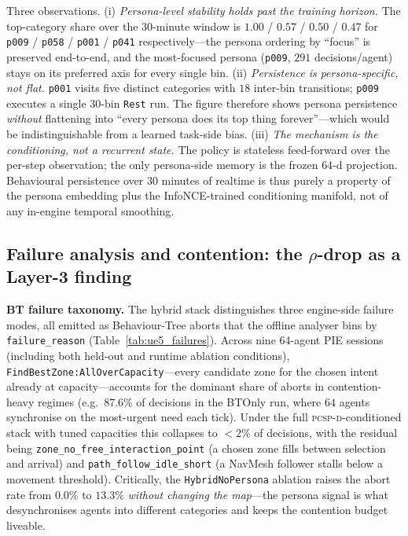 \documentclass[conference]{IEEEtran}
\newcommand{\PCSPD}{\textsc{pcsp-d}\xspace}
\begin{document}
Three observations. (i) \emph{Persona-level stability holds past the
training horizon.} The top-category share over the $30$-minute window
is $1.00$ / $0.57$ / $0.50$ / $0.47$ for \texttt{p009} / \texttt{p058} /
\texttt{p001} / \texttt{p041} respectively---the persona ordering by
``focus'' is preserved end-to-end, and the most-focused persona
(\texttt{p009}, $291$ decisions/agent) stays on its preferred axis for
every single bin. (ii) \emph{Persistence is persona-specific, not flat.}
\texttt{p001} visits five distinct categories with $18$ inter-bin
transitions; \texttt{p009} executes a single $30$-bin \texttt{Rest} run.
The figure therefore shows persona persistence \emph{without} flattening
into ``every persona does its top thing forever''---which would be
indistinguishable from a learned task-side bias. (iii) \emph{The
mechanism is the conditioning, not a recurrent state.} The policy is
stateless feed-forward over the per-step observation; the only
persona-side memory is the frozen $64$-d projection. Behavioural
persistence over $30$ minutes of realtime is thus purely a property of
the persona embedding plus the InfoNCE-trained conditioning manifold,
not of any in-engine temporal smoothing.


\subsection{Failure analysis and contention: the $\rho$-drop as a Layer-3 finding}
\label{sec:ue5_contention}

\textbf{BT failure taxonomy.}
The hybrid stack distinguishes three engine-side failure modes, all emitted
as Behaviour-Tree aborts that the offline analyser bins by
\texttt{failure\_reason} (Table~\ref{tab:ue5_failures}). Across nine 64-agent
PIE sessions
(including both held-out and runtime ablation conditions),
\texttt{FindBestZone:AllOverCapacity}---every candidate zone for the chosen
intent already at capacity---accounts for the dominant share of aborts in
contention-heavy regimes (e.g.\ 87.6\% of decisions in the BTOnly run, where
$64$ agents synchronise on the most-urgent need each tick). Under the full
\PCSPD-conditioned stack with tuned capacities this collapses to
$<\!2$\% of decisions, with the residual being
\texttt{zone\_no\_free\_interaction\_point} (a chosen zone fills between
selection and arrival) and \texttt{path\_follow\_idle\_short} (a NavMesh
follower stalls below a movement threshold). Critically, the
\texttt{HybridNoPersona} ablation raises the abort rate from $0.0\%$ to
$13.3\%$ \emph{without changing the map}---the persona signal is what
desynchronises agents into different categories and keeps the contention
budget liveable.
\end{document}
